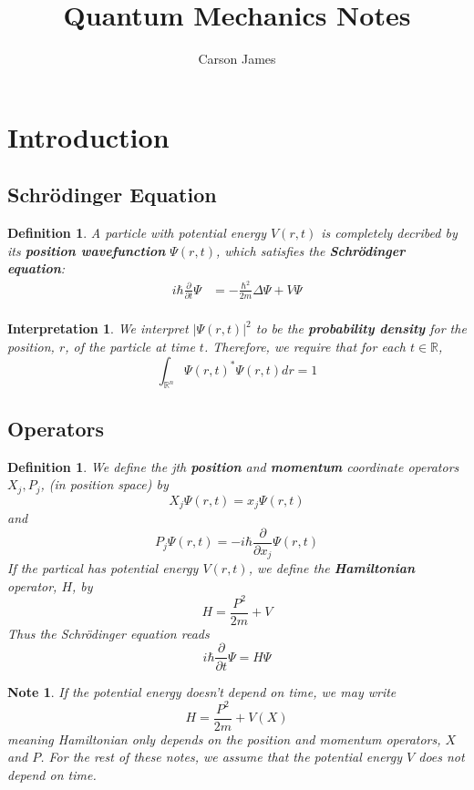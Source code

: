 \documentclass[12pt]{amsart}
\newtheorem{defn}[thm]{Definition}
\newtheorem{intp}[thm]{Interpretation}
\newtheorem{note}[thm]{Note}
\newcommand{\Del}{\Delta}
\newcommand{\R}{\mathbb{R}}
\newcommand{\p}[1]{\frac{\partial}{\partial{#1}}}
\begin{document}
\title{Quantum Mechanics Notes}
\author[James]{Carson James}
\maketitle


\tableofcontents

\section{Introduction}
\subsection{Schr\"{o}dinger Equation}

\begin{defn}
A particle with potential energy $V(r,t)$ is completely decribed by its \textbf{position wavefunction} $\Psi(r,t)$, which satisfies the \textbf{Schr\"{o}dinger equation}: 
\begin{align*}
i\hbar \p{t} \Psi 
&= -\frac{\hbar^2}{2m} \Del \Psi + V \Psi\\
\end{align*}
\end{defn}

\begin{intp}
We interpret $\vert\Psi(r,t)\vert^2$ to be the \textbf{probability density} for the position, $r$, of the particle at time $t$. Therefore, we require that for each $t \in \R$, $$\int_{\R^n}\Psi(r,t)^* \Psi(r,t) dr = 1$$
\end{intp}

\subsection{Operators}

\begin{defn}

We define the jth \textbf{position} and \textbf{momentum} coordinate operators $X_j,P_j$, (in position space) by $$X_j \Psi(r,t) = x_j \Psi(r,t)$$ and $$P_j \Psi(r,t) = -i \hbar \p{x_j} \Psi(r,t)$$ 
If the partical has potential energy $V(r,t)$, we define the \textbf{Hamiltonian} operator, $H$, by $$H = \frac{P^2}{2m} + V$$ Thus the Schr\"{o}dinger equation reads $$i\hbar \p{t}\Psi = H \Psi$$ 
\end{defn}

\begin{note}
If the potential energy doesn't depend on time, we may write $$H = \frac{P^2}{2m} + V(X)$$ meaning Hamiltonian only depends on the position and momentum operators, $X$ and $P$. For the rest of these notes, we assume that the potential energy $V$ does not depend on time.
\end{note}
\end{document}
